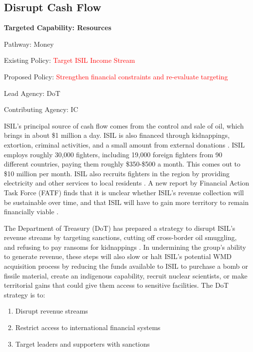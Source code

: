 \documentclass{report}
\begin{document}
\subsection{Disrupt Cash Flow}

\bfseries Targeted Capability: Resources 

Pathway: Money 

Existing Policy: \textcolor{red}{Target ISIL Income Stream}

Proposed Policy: \textcolor{red}{Strengthen financial constraints and re-evaluate targeting}  

Lead Agency: DoT

Contributing Agency: IC \normalfont


ISIL's principal source of cash flow comes from the control and sale of oil, which brings in about \$1 million a day. ISIL is also financed through kidnappings, extortion, criminal activities, and a small amount from external donations \cite{Lister2014}. ISIL employs roughly 30,000 fighters, including 19,000 foreign fighters from 90 different countries, paying them roughly \$350-\$500 a month. This comes out to \$10 million per month. ISIL also recruits fighters in the region by providing electricity and other services to local residents \cite{TheEditorialBoard2015}. A new report by Financial Action Task Force (FATF) finds that it is unclear whether ISIL's revenue collection will be sustainable over time, and that ISIL will have to gain more territory to remain financially viable \cite{TheEditorialBoard2015,Report2015}.

The Department of Treasury (DoT) has prepared a strategy to disrupt ISIL's revenue streams by targeting sanctions, cutting off cross-border oil smuggling, and refusing to pay ransoms for kidnappings \cite{Cohen2014}. In undermining the group's ability to generate revenue, these steps will also slow or halt ISIL's potential WMD acquisition process by reducing the funds available to ISIL to purchase a bomb or fissile material, create an indigenous capability, recruit nuclear scientists, or make territorial gains that could give them access to sensitive facilities. The DoT strategy is to:

\begin{enumerate}
 \item Disrupt revenue streams
 \item Restrict access to international financial systems
 \item Target leaders and supporters with sanctions
\end{enumerate}
\end{document}
